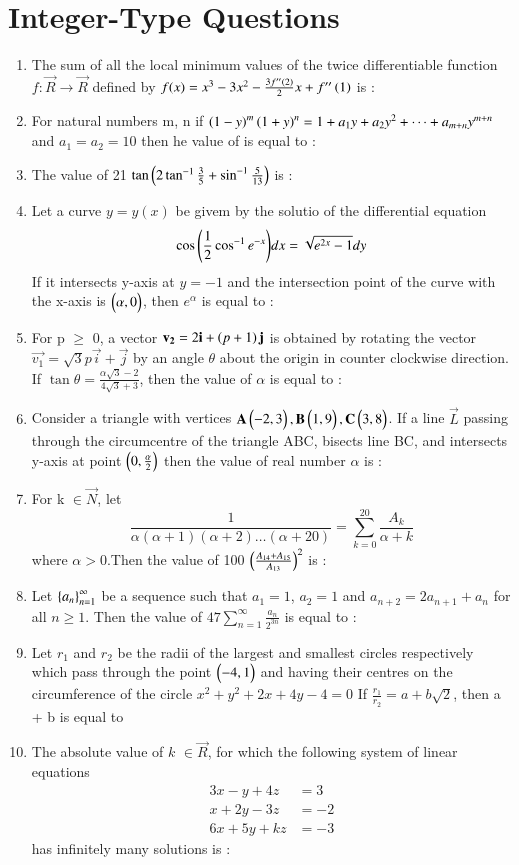 \documentclass[journal,12pt,onecolumn]{IEEEtran}
\theoremstyle{remark}
\begin{document}
\section{Integer-Type Questions}
\begin{enumerate}
	\item The sum of all the local minimum values of the twice differentiable function $ f : \vec{R} \rightarrow \vec{R} $ defined by $ f(x) = x^3 - 3x^2 - \frac{3 f^{\prime \prime}\left(2\right)}{2}x + f^{\prime \prime}\left(1\right)$ is :

	\item For natural numbers m, n if $\left(1-y\right)^m\left(1+y\right)^n = 1 + a_{1}y + a_{2}y^{2} + \dots + a_{m+n}y^{m+n}$ and $a_{1} = a_{2} = 10$ then he value of  is equal to :

	\item The value of 21 $\tan \left({2 \tan^{-1}{\frac{3}{5} + \sin^{-1}{\frac{5}{13}}}}\right)$ is :

	\item Let a curve $ y = y(x)$ be givem by the solutio of the differential equation $$\cos{\ensuremath{\left(\frac{1}{2}\cos^{-1}{e^{-x}}\right)}} dx = \sqrt{e^{2x} - 1} dy $$If it intersects y-axis at $y=-1$ and the intersection point of the curve with the x-axis is $\begin{pmatrix}\alpha , 0\end{pmatrix}$, then $e^{\alpha}$ is equal to :
	\item For p $\geq$ 0, a vector $\mathbf{v_2} = 2\mathbf{i} + \left(p+1\right)\mathbf{j}$ is obtained by rotating the vector $\vec{v_1} = \sqrt{3}p\vec{i} + \vec{j}$ by an angle $\theta$ about the origin in counter clockwise direction. If $\tan{\theta} = \frac{\alpha\sqrt{3} - 2}{4\sqrt{3} + 3}$, then the value of $\alpha$ is equal to :
	\item Consider a triangle with vertices $\mathbf{A} \begin{pmatrix}-2,3\end{pmatrix}, \mathbf{B} \begin{pmatrix}1,9\end{pmatrix}, \mathbf{C} \begin{pmatrix}3,8\end{pmatrix}$. If a line $\vec{L}$ passing through the circumcentre of the triangle ABC, bisects line BC, and intersects y-axis at point $\begin{pmatrix}0,\frac{\alpha}{2}\end{pmatrix}$ then the value of real number $\alpha$ is :
	\item For k $\in \vec{N}$, let $$ \frac{1}{\alpha(\alpha +1)(\alpha +2)\dots(\alpha +20)} = \sum_{k=0}^{20} \frac{A_k}{\alpha + k} $$ where $\alpha>0$.Then the value of 100 $\left(\frac{A_{14} + A_{15}}{A_{13}}\right)^2 $ is :
	\item Let $\left\{a_{n}\right\}_{n=1}^{\infty}$ be a sequence such that $a_1 = 1$, $a_2 = 1$ and $a_{n+2} = 2a_{n+1} + a_{n}$ for all $n \geq 1$. Then the value of $47 \sum_{n=1}^{\infty} \frac{a_{n}}{2^{3n}}$ is equal to :
	\item Let $r_{1}$ and $r_{2}$ be the radii of the largest and smallest circles respectively which pass through the point $\begin{pmatrix}-4,1\end{pmatrix}$ and having their centres on the circumference of the circle $ x^2 + y^2 + 2x + 4y - 4 = 0$ If $\frac{r_{1}}{r_{2}} = a + b\sqrt{2}$, then a + b is equal to 
	\item The absolute value of $k$ $ \in \vec{R}$, for which the following system of linear equations 
		\begin{align}
			3x - y + 4z &= 3 \\ 
			x + 2y - 3z &= -2 \\
			6x + 5y + kz &= -3 
		\end{align}
		has infinitely many solutions is :
\end{enumerate}
\end{document}
